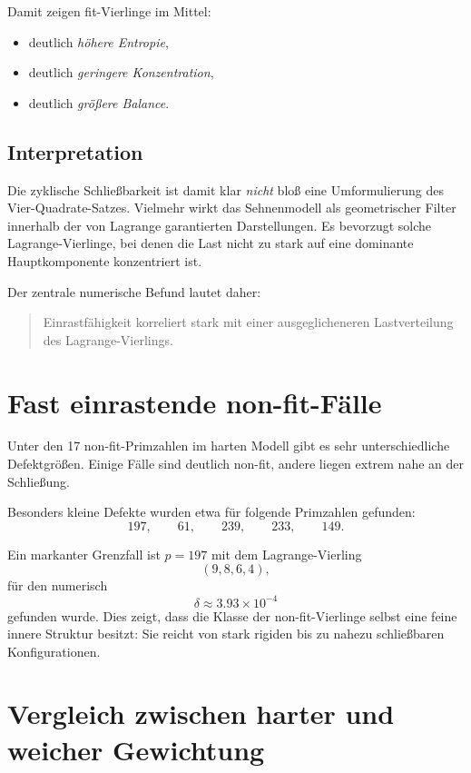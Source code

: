 \documentclass[11pt,a4paper]{article}
\theoremstyle{remark}
\begin{document}
	Damit zeigen fit-Vierlinge im Mittel:
	
	\begin{itemize}
		\item deutlich \emph{höhere Entropie},
		\item deutlich \emph{geringere Konzentration},
		\item deutlich \emph{größere Balance}.
	\end{itemize}
	
	\subsection{Interpretation}
	
	Die zyklische Schließbarkeit ist damit klar \emph{nicht} bloß eine Umformulierung des Vier-Quadrate-Satzes. Vielmehr wirkt das Sehnenmodell als geometrischer Filter innerhalb der von Lagrange garantierten Darstellungen. Es bevorzugt solche Lagrange-Vierlinge, bei denen die Last nicht zu stark auf eine dominante Hauptkomponente konzentriert ist.
	
	Der zentrale numerische Befund lautet daher:
	\begin{quote}
		Einrastfähigkeit korreliert stark mit einer ausgeglicheneren Lastverteilung des Lagrange-Vierlings.
	\end{quote}
	
	\section{Fast einrastende non-fit-Fälle}
	
	Unter den 17 non-fit-Primzahlen im harten Modell gibt es sehr unterschiedliche Defektgrößen. Einige Fälle sind deutlich non-fit, andere liegen extrem nahe an der Schließung.
	
	Besonders kleine Defekte wurden etwa für folgende Primzahlen gefunden:
	\[
	197,\qquad 61,\qquad 239,\qquad 233,\qquad 149.
	\]
	
	Ein markanter Grenzfall ist \(p=197\) mit dem Lagrange-Vierling
	\[
	(9,8,6,4),
	\]
	für den numerisch
	\[
	\delta \approx 3.93\times 10^{-4}
	\]
	gefunden wurde. Dies zeigt, dass die Klasse der non-fit-Vierlinge selbst eine feine innere Struktur besitzt: Sie reicht von stark rigiden bis zu nahezu schließbaren Konfigurationen.
	
	\section{Vergleich zwischen harter und weicher Gewichtung}
	
\end{document}
